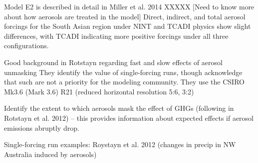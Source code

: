 \documentclass[11pt,reqno]{amsart}
\begin{document}
\begin{itemize}
Model E2 is described in detail in Miller et al. 2014 XXXXX   [Need to know more about how aerosols are treated in the model]    Direct, indirect, and total aerosol forcings for the South Asian region under NINT and TCADI physics show slight differences, with TCADI indicating more positive forcings under all three configurations.  


Good background in Rotstayn regarding fast and slow effects of aerosol unmasking 
They identify the value of single-forcing runs, though acknowledge that such are not a priority for the modeling community.  They use the CSIRO Mk3.6 (Mark 3.6) R21 (reduced horizontal resolution 5:6, 3:2) 

Identify the extent to which aerosols mask the effect of GHGs (following in Rotstayn et al. 2012) -- this provides information about expected effects if aerosol emissions abruptly drop.  



Single-forcing run examples: Roystayn et al. 2012 (changes in precip in NW Australia induced by aerosols) 

\end{itemize}




%
%
\end{document}
